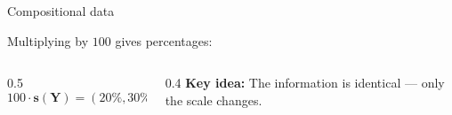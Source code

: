 \begin{frame}{Compositional data}
{\vspace{0.2cm}
Multiplying by $100$ gives percentages:
\vspace{0.2cm}

\begin{columns}
    \begin{column}{0.5\textwidth}
        \[
        100 \cdot \mathbf{s}(\mathbf{Y}) = (20\%, 30\%, 50\%)
        \]
    \end{column}
    \begin{column}{0.4\textwidth}
        \textbf{Key idea:} The information is identical — only the scale changes.
    \end{column}
\end{columns}


}

\end{frame}



    








